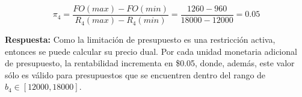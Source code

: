 \documentclass[letterpaper,11pt,oneside]{article}
\begin{document}
\begin{itemize}
	\begin{equation*}
	\pi_{4}=\frac{FO(max)-FO(min)}{R_{4}(max)-R_{4}(min)}=\frac{1260-960}{18000-12000}=0.05
	\end{equation*}
	
	\textbf{Respuesta:} Como la limitación de presupuesto es una restricción activa, entonces se puede calcular su precio dual. Por cada unidad monetaria adicional de presupuesto, la rentabilidad incrementa en \$0.05, donde, además, este valor sólo es válido para presupuestos que se encuentren dentro del rango de $b_{4} \in [12000,18000]$.
\end{itemize}
\end{document}
